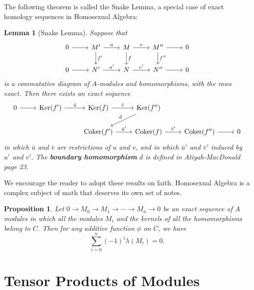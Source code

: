 \documentclass[11pt]{article}
\newtheorem{lemma}{Lemma}
\newtheorem{proposition}{Proposition}
\newcommand{\Ker}{\operatorname{Ker}}
\newcommand{\Coker}{\operatorname{Coker}}
\begin{document}
The following theorem is called the Snake Lemma, a special case of exact homology sequences in Homosexual Algebra: 

\begin{adjustwidth}{0.5cm}{}
  \begin{lemma}[Snake Lemma]
    Suppose that
    \[ \begin{tikzcd}
      0 \arrow[r] & M' \arrow[r, "u"] \arrow[d, "f'"] & M \arrow[r, "v"] \arrow[d, "f"] & M'' \arrow[r] \arrow[d, "f''"] & 0 \\
      0 \arrow[r] & N' \arrow[r, "u'"]                & N \arrow[r, "v'"]               & N'' \arrow[r]                  & 0
    \end{tikzcd} \]
    is a commutative diagram of $A$-modules and homomorphisms, with the rows exact. Then there exists an exact sequence
    \[ \begin{tikzcd}
      0 \arrow[r] & \Ker(f') \arrow[r, "\bar{u}"] & \Ker(f) \arrow[r, "\bar{v}"]     & \Ker(f'') \arrow[ld, "d"']      &                       &   \\
                  &                               & \Coker(f') \arrow[r, "\bar{u}'"] & \Coker(f) \arrow[r, "\bar{v}'"] & \Coker(f'') \arrow[r] & 0
    \end{tikzcd} \]
    in which $\bar{u}$ and $\bar{v}$ are restrictions of $u$ and $v$, and in which $\bar{u}'$ and $\bar{v}'$ induced by $u'$ and $v'$. The \textbf{boundary homomorphism} $d$ is defined in Atiyah-MacDonald page 23.
  \end{lemma}
\end{adjustwidth}

We encourage the reader to adopt these results on faith. Homosexual Algebra is a complex subject of math that deserves its own set of notes.

\begin{adjustwidth}{0.5cm}{}
  \begin{proposition}
    Let $0 \to M_{0} \to M_{1} \to \cdots \to M_{n} \to 0$ be an exact sequence of $A$ modules in which all the modules $M_{i}$ and the kernels of all the homomorphisms belong to $C$. Then for any additive function $\phi$ on $C$, we have
    \[
      \sum\limits_{i = 0}^{n} (-1)^{i} \lambda(M_{i}) = 0.
    \]
  \end{proposition}
\end{adjustwidth}


\section{Tensor Products of Modules}
\end{document}
